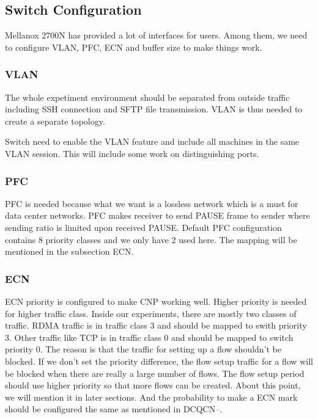 \documentclass{article}
\begin{document}
\subsection{Switch Configuration}

Mellanox 2700N has provided a lot of interfaces for users. Among them, we need to configure VLAN, PFC, ECN and buffer size to make things work.

\subsubsection{VLAN}
The whole expetiment environment should be separated from outside traffic including SSH connection and SFTP file transmission.
VLAN is thus needed to create a separate topology.

Switch need to enable the VLAN feature and include all machines in the same VLAN session.
This will include some work on distinguishing ports.

\subsubsection{PFC}
PFC is needed because what we want is a lossless network which is a must for data center networks.
PFC makes receiver to send PAUSE frame to sender where sending ratio is limited upon received PAUSE.
Default PFC configuration contains 8 priority classes and we only have 2 used here.
The mapping will be mentioned in the subsection ECN.

\subsubsection{ECN}
ECN priority is configured to make CNP working well. Higher priority is needed for higher traffic class.
Inside our experiments, there are mostly two classes of traffic. RDMA traffic is in traffic class 3 and should be mapped to swith priority 3.
Other traffic like TCP is in traffic class 0 and should be mapped to switch priority 0.
The reason is that the traffic for setting up a flow shouldn't be blocked. If we don't set the priority difference, the flow setup traffic for a flow
will be blocked when there are really a large number of flows. The flow setup period should use higher priority so that more flows can be created.
About this point, we will mention it in later sections.
And the probability to make a ECN mark should be configured the same as mentioned in DCQCN--.
\end{document}
